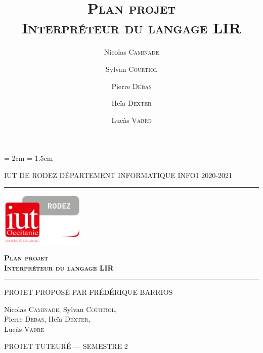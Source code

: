 \documentclass[11pt,a4paper,titlepage,openright]{report}
\title{\textsc{\textbf{Plan projet\\Interpréteur du langage LIR}}}
\date{}
\author{Nicolas \textsc{Caminade} \and Sylvan \textsc{Courtiol} \and Pierre \textsc{Debas} \and Heïa \textsc{Dexter} \and Lucàs \textsc{Vabre} }
\begin{document}
    \lhead{\leftmark}

    \cfoot{\thepage}
    \headheight = 2cm
    \headsep = 1.5cm


    \begin{titlepage}
        \selectfont

        \begin{center}\normalsize
            \MakeUppercase{IUT de Rodez \hfill Département informatique \hfill INFO1 2020-2021}
        \end{center}
        \vspace*{0.1cm}
        \hrule
        \vspace*{0.2cm}
        \begin{flushright}
            \includegraphics[width=4cm]{img/logoiut}
        \end{flushright}
        \vspace*{2cm}
        \begin{flushright}\Huge
            \textsc{\textbf{Plan projet\\Interpréteur du langage LIR}}
        \end{flushright}
        \hrule
        \begin{flushleft}
            \MakeUppercase{Projet proposé par Frédérique Barrios}
        \end{flushleft}
        \vspace*{2cm}
        \begin{center}\Large
            Nicolas \textsc{Caminade}, Sylvan \textsc{Courtiol},\\
            Pierre \textsc{Debas}, Heïa \textsc{Dexter}, \\
            Lucàs \textsc{Vabre}
        \end{center}
        \vfill
        \begin{center}\normalsize
            \MakeUppercase{Projet tuteuré --- Semestre 2}
        \end{center}
    \end{titlepage}
\end{document}
